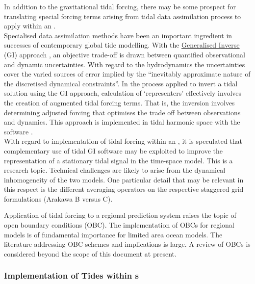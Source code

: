 In addition to the gravitational tidal forcing, there may be some prospect for translating special forcing terms arising from tidal data assimilation process to apply within an \OGCM{}. \\
Specialised data assimilation methods have been an important ingredient in successes of contemporary global tide modelling.  With the \underline{Generalised Inverse} (GI) \cite[pp345] {Zaron:2011ft} approach , an objective trade-off is drawn between quantified observational and dynamic uncertainties.  With regard to the hydrodynamics the uncertainties cover the varied sources of error implied by the ``inevitably approximate nature of the discretised dynamical constraints''\cite[pp155]{Egbert:1996vr}.  In the process applied to invert a tidal solution using the GI approach, calculation of `representers' effectively involves the creation of augmented tidal forcing terms.   That is, the inversion involves determining adjusted forcing that optimises the trade off between observations and dynamics.   This approach is implemented in tidal harmonic space with the \OTIS{} software \cite{Egbert:2002ug}.\\
With regard to implementation of tidal forcing within an \OGCM{}, it is speculated that complementary use of tidal GI software \OTIS{} may be exploited to improve the representation of a stationary tidal signal in the time-space model.   
This is a research topic.   Technical challenges are likely to arise from the dynamical inhomogeneity of the two models.  One particular detail that may be relevant in this respect is the different averaging operators on the respective staggered grid formulations (Arakawa B versus C).




Application of tidal forcing to a regional prediction system raises the topic of open boundary conditions (OBC).  The implementation of OBCs for regional models is of fundamental importance for limited area ocean models.  The literature addressing OBC schemes and implications is large.  A review of OBCs is considered beyond the scope of this document at present.\\


\subsubsection{Implementation of Tides within \OGCM{}s}

